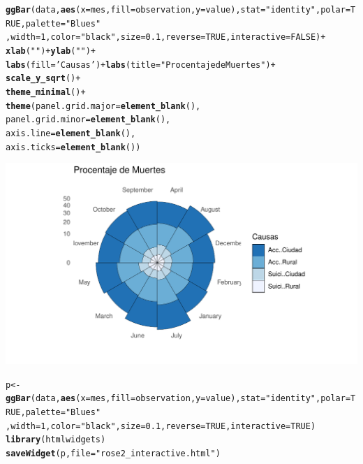 \documentclass{article}\usepackage[]{graphicx}\usepackage[]{color}
\makeatletter
\def\maxwidth{ %
  \ifdim\Gin@nat@width>\linewidth
    \linewidth
  \else
    \Gin@nat@width
  \fi
}
\newcommand{\hlnum}[1]{\textcolor[rgb]{0.686,0.059,0.569}{#1}}%
\newcommand{\hlstr}[1]{\textcolor[rgb]{0.192,0.494,0.8}{#1}}%
\newcommand{\hlopt}[1]{\textcolor[rgb]{0,0,0}{#1}}%
\newcommand{\hlstd}[1]{\textcolor[rgb]{0.345,0.345,0.345}{#1}}%
\newcommand{\hlkwb}[1]{\textcolor[rgb]{0.69,0.353,0.396}{#1}}%
\newcommand{\hlkwc}[1]{\textcolor[rgb]{0.333,0.667,0.333}{#1}}%
\newcommand{\hlkwd}[1]{\textcolor[rgb]{0.737,0.353,0.396}{\textbf{#1}}}%
\newenvironment{kframe}{%
 \def\at@end@of@kframe{}%
 \ifinner\ifhmode%
  \def\at@end@of@kframe{\end{minipage}}%
  \begin{minipage}{\columnwidth}%
 \fi\fi%
 \def\FrameCommand##1{\hskip\@totalleftmargin \hskip-\fboxsep
 \colorbox{shadecolor}{##1}\hskip-\fboxsep
     \hskip-\linewidth \hskip-\@totalleftmargin \hskip\columnwidth}%
 \MakeFramed {\advance\hsize-\width
   \@totalleftmargin\z@ \linewidth\hsize
   \@setminipage}}%
 {\par\unskip\endMakeFramed%
 \at@end@of@kframe}
\newenvironment{knitrout}{}{} %
\makeatother
\begin{document}
\begin{knitrout}
\color{fgcolor}\begin{kframe}
\begin{alltt}
\hlkwd{ggBar}\hlstd{(data,} \hlkwd{aes}\hlstd{(}\hlkwc{x}\hlstd{=mes,}\hlkwc{fill}\hlstd{=observation,}\hlkwc{y}\hlstd{=value),}\hlkwc{stat}\hlstd{=}\hlstr{"identity"}\hlstd{,}\hlkwc{polar}\hlstd{=}\hlnum{TRUE}\hlstd{,}\hlkwc{palette}\hlstd{=}\hlstr{"Blues"}
      \hlstd{,}\hlkwc{width}\hlstd{=}\hlnum{1}\hlstd{,} \hlkwc{color}\hlstd{=}\hlstr{"black"}\hlstd{,}\hlkwc{size}\hlstd{=}\hlnum{0.1}\hlstd{,}\hlkwc{reverse}\hlstd{=}\hlnum{TRUE}\hlstd{,}\hlkwc{interactive}\hlstd{=}\hlnum{FALSE}\hlstd{)}\hlopt{+}
    \hlkwd{xlab}\hlstd{(}\hlstr{""}\hlstd{)} \hlopt{+}  \hlkwd{ylab}\hlstd{(}\hlstr{""}\hlstd{)} \hlopt{+}
  \hlkwd{labs}\hlstd{(}\hlkwc{fill}\hlstd{=}\hlstr{'Causas'}\hlstd{)} \hlopt{+} \hlkwd{labs}\hlstd{(}\hlkwc{title} \hlstd{=} \hlstr{"Procentaje de Muertes"}\hlstd{)} \hlopt{+}
    \hlkwd{scale_y_sqrt}\hlstd{()} \hlopt{+}
    \hlkwd{theme_minimal}\hlstd{()} \hlopt{+}
    \hlkwd{theme}\hlstd{(}\hlkwc{panel.grid.major} \hlstd{=} \hlkwd{element_blank}\hlstd{(),}
          \hlkwc{panel.grid.minor} \hlstd{=} \hlkwd{element_blank}\hlstd{(),}
          \hlkwc{axis.line} \hlstd{=} \hlkwd{element_blank}\hlstd{(),}
          \hlkwc{axis.ticks} \hlstd{=} \hlkwd{element_blank}\hlstd{())}
\end{alltt}
\end{kframe}

{\centering \includegraphics[width=\maxwidth]{figure/plot_bar_rose-1} 

}


\begin{kframe}\begin{alltt}
\hlstd{p} \hlkwb{<-} \hlkwd{ggBar}\hlstd{(data,} \hlkwd{aes}\hlstd{(}\hlkwc{x}\hlstd{=mes,}\hlkwc{fill}\hlstd{=observation,}\hlkwc{y}\hlstd{=value),}\hlkwc{stat}\hlstd{=}\hlstr{"identity"}\hlstd{,}\hlkwc{polar}\hlstd{=}\hlnum{TRUE}\hlstd{,}\hlkwc{palette}\hlstd{=}\hlstr{"Blues"}
      \hlstd{,}\hlkwc{width}\hlstd{=}\hlnum{1}\hlstd{,} \hlkwc{color}\hlstd{=}\hlstr{"black"}\hlstd{,}\hlkwc{size}\hlstd{=}\hlnum{0.1}\hlstd{,}\hlkwc{reverse}\hlstd{=}\hlnum{TRUE}\hlstd{,}\hlkwc{interactive}\hlstd{=}\hlnum{TRUE}\hlstd{)}
\hlkwd{library}\hlstd{(htmlwidgets)}
\hlkwd{saveWidget}\hlstd{(p,} \hlkwc{file} \hlstd{=} \hlstr{"rose2_interactive.html"}\hlstd{)}
\end{alltt}
\end{kframe}
\end{knitrout}
\end{document}

